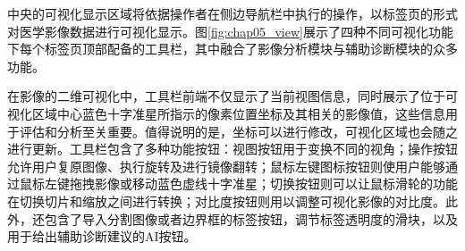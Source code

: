 中央的可视化显示区域将依据操作者在侧边导航栏中执行的操作，以标签页的形式对医学影像数据进行可视化显示。图\ref{fig:chap05_view}展示了四种不同可视化功能下每个标签页顶部配备的工具栏，其中融合了影像分析模块与辅助诊断模块的众多功能。

在影像的二维可视化中，工具栏前端不仅显示了当前视图信息，同时展示了位于可视化区域中心蓝色十字准星所指示的像素位置坐标及其相关的影像值，这些信息用于评估和分析至关重要。值得说明的是，坐标可以进行修改，可视化区域也会随之进行更新。工具栏包含了多种功能按钮：视图按钮用于变换不同的视角；操作按钮允许用户复原图像、执行旋转及进行镜像翻转；鼠标左键图标按钮则使用户能够通过鼠标左键拖拽影像或移动蓝色虚线十字准星；切换按钮则可以让鼠标滑轮的功能在切换切片和缩放之间进行转换；对比度按钮则用以调整可视化影像的对比度。此外，还包含了导入分割图像或者边界框的标签按钮，调节标签透明度的滑块，以及用于给出辅助诊断建议的AI按钮。

